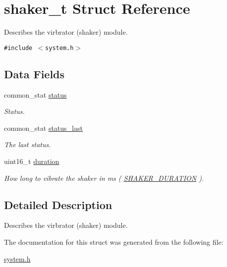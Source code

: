 \hypertarget{structshaker__t}{
\section{shaker\_\-t Struct Reference}
\label{structshaker__t}
}
Describes the virbrator (shaker) module.  


{\tt \#include $<$system.h$>$}

\subsection*{Data Fields}
\begin{CompactItemize}
\item 
\hypertarget{structshaker__t_ed75f0a6f90deca5e08c5c3ca7de807a}{
common\_\-stat \hyperlink{structshaker__t_ed75f0a6f90deca5e08c5c3ca7de807a}{status}}
\label{structshaker__t_ed75f0a6f90deca5e08c5c3ca7de807a}

\begin{CompactList}\small\item\em Status. \item\end{CompactList}\item 
\hypertarget{structshaker__t_4c846165672d311f155fe5f921391960}{
common\_\-stat \hyperlink{structshaker__t_4c846165672d311f155fe5f921391960}{status\_\-last}}
\label{structshaker__t_4c846165672d311f155fe5f921391960}

\begin{CompactList}\small\item\em The last status. \item\end{CompactList}\item 
\hypertarget{structshaker__t_10dbe7efe5e245672a98da6ed1e7ef24}{
uint16\_\-t \hyperlink{structshaker__t_10dbe7efe5e245672a98da6ed1e7ef24}{duration}}
\label{structshaker__t_10dbe7efe5e245672a98da6ed1e7ef24}

\begin{CompactList}\small\item\em How long to vibrate the shaker in ms ( \hyperlink{system_8h_d8045dfbdcc349183fd4d4b94936ce3e}{SHAKER\_\-DURATION} ). \item\end{CompactList}\end{CompactItemize}


\subsection{Detailed Description}
Describes the virbrator (shaker) module. 

The documentation for this struct was generated from the following file:\begin{CompactItemize}
\item 
\hyperlink{system_8h}{system.h}\end{CompactItemize}
